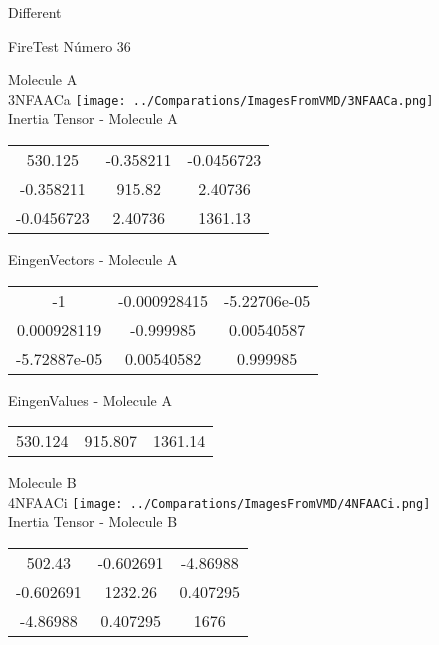 \begin{center}
\vtab
\vtab
\textcolor{NavyBlue}{\Large Different}
\end{center}

 \newpage

\vtab[-2cm]
\begin{center}
{\large FireTest \tab Número 36}
\end{center}
\begin{multicols}{2}
\begin{center}

Molecule A \\ 
3NFAACa
\texttt{[image: ../Comparations/ImagesFromVMD/3NFAACa.png]}
\\
Inertia Tensor - Molecule A \\
\vtab

\begin{tabular}{|c c c|}
530.125	 & 	-0.358211	 & 	-0.0456723	 \\
-0.358211	 & 	915.82	 & 	2.40736	 \\
-0.0456723	 & 	2.40736	 & 	1361.13
\end{tabular}

\vtab
 EingenVectors - Molecule A     \\
\vtab
\begin{tabular}{|c c c|}
-1	 & 	-0.000928415	 & 	-5.22706e-05	 \\
0.000928119	 & 	-0.999985	 & 	0.00540587	 \\
-5.72887e-05	 & 	0.00540582	 & 	0.999985
\end{tabular}

\vtab
 EingenValues - Molecule A     \\
\vtab
\begin{tabular}{|c c c|}
530.124	 & 	915.807	 & 	1361.14	 \\
\end{tabular}
\columnbreak

Molecule B \\ 
4NFAACi
\texttt{[image: ../Comparations/ImagesFromVMD/4NFAACi.png]}
\\
Inertia Tensor - Molecule B \\
\vtab

\begin{tabular}{|c c c|}
502.43	 & 	-0.602691	 & 	-4.86988	 \\
-0.602691	 & 	1232.26	 & 	0.407295	 \\
-4.86988	 & 	0.407295	 & 	1676
\end{tabular}


\end{center}
\end{multicols}

